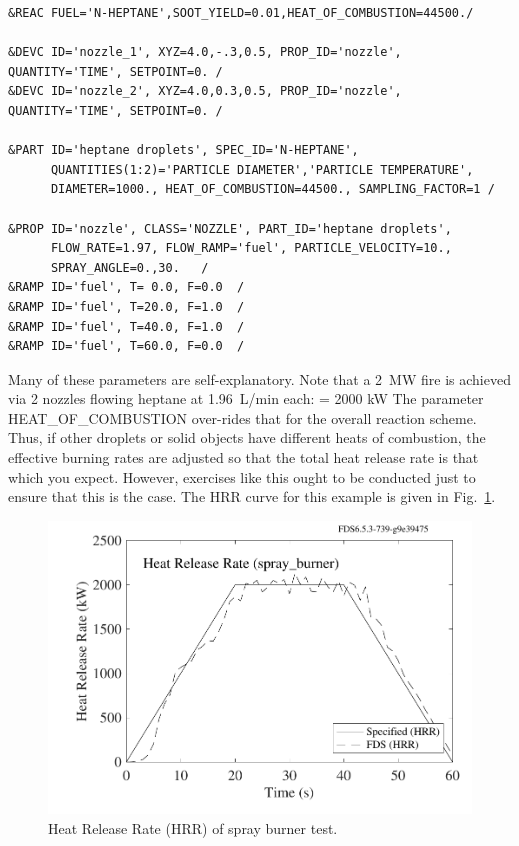 \documentclass[11pt]{book}
\begin{document}
\begin{lstlisting}
&REAC FUEL='N-HEPTANE',SOOT_YIELD=0.01,HEAT_OF_COMBUSTION=44500./

&DEVC ID='nozzle_1', XYZ=4.0,-.3,0.5, PROP_ID='nozzle', QUANTITY='TIME', SETPOINT=0. /
&DEVC ID='nozzle_2', XYZ=4.0,0.3,0.5, PROP_ID='nozzle', QUANTITY='TIME', SETPOINT=0. /

&PART ID='heptane droplets', SPEC_ID='N-HEPTANE',
      QUANTITIES(1:2)='PARTICLE DIAMETER','PARTICLE TEMPERATURE',
      DIAMETER=1000., HEAT_OF_COMBUSTION=44500., SAMPLING_FACTOR=1 /

&PROP ID='nozzle', CLASS='NOZZLE', PART_ID='heptane droplets',
      FLOW_RATE=1.97, FLOW_RAMP='fuel', PARTICLE_VELOCITY=10.,
      SPRAY_ANGLE=0.,30.   /
&RAMP ID='fuel', T= 0.0, F=0.0  /
&RAMP ID='fuel', T=20.0, F=1.0  /
&RAMP ID='fuel', T=40.0, F=1.0  /
&RAMP ID='fuel', T=60.0, F=0.0  /
\end{lstlisting}

\noindent
Many of these parameters are self-explanatory. Note that a 2~MW fire is achieved via 2 nozzles flowing heptane at 1.96~L/min each:
  \;  \times {} \;   \;
 \times {} \;   \;
 = 2000 \; \hbox{kW} \ee
The parameter {\ct HEAT\_OF\_COMBUSTION} over-rides that for the overall
reaction scheme. Thus, if other droplets or solid objects have different
heats of combustion, the effective burning rates are adjusted so that the
total heat release rate is that which you expect. However, exercises
like this ought to be conducted just to ensure that this is the case.
The HRR curve for this example is given in Fig.~\ref{spray_burner}.

\begin{figure}[ht]
\begin{center}
\includegraphics[width=4.5in]{SCRIPT_FIGURES/spray_burner_HRR}
\end{center}
\caption[Results of the {\ct spray\_burner} test case]{Heat Release Rate (HRR) of spray burner test.}
\label{spray_burner}
\end{figure}
\end{document}
